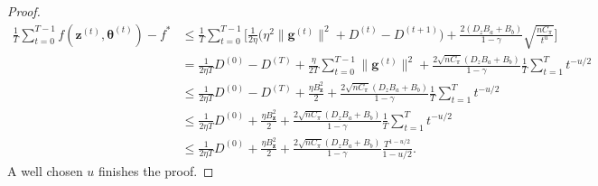 \begin{proof}
\begin{align*}
    \frac{1}{T} \sum_{t=0}^{T-1} f(\bm{z}^{(t)},\bm{\theta}^{(t)}) - f^* 
    &\leq  \frac{1}{T} \sum_{t=0}^{T-1} \Bigg[ 
    \frac{1}{2\eta} \Big( 
         \eta^2\|\bm{g}^{(t)}\|^2
         + D^{(t)} - D^{(t+1)}
     \Big) 
     + \frac{2(D_z B_a+B_b)}{1 - \gamma} \sqrt{\frac{n C_\pi}{t^u}}
    \Bigg] \\
    &=   \frac{1}{2\eta T} D^{(0)} - D^{(T)}   
    +\frac{\eta}{2T} \sum_{t=0}^{T-1} 
         \|\bm{g}^{(t)}\|^2 
        + \frac{2 \sqrt{n C_\pi}  (D_z B_a+B_b)}{1 - \gamma}
        \frac{1}{T}\sum_{t=1}^{T} t^{-u/2}
        \\
    &\leq   \frac{1}{2\eta T} D^{(0)} - D^{(T)}   
    +\frac{\eta B_{\bm{z}}^2}{2} 
        + \frac{2 \sqrt{n C_\pi}  (D_z B_a+B_b)}{1 - \gamma}
        \frac{1}{T}\sum_{t=1}^{T} t^{-u/2} \\
    &\leq   \frac{1}{2\eta T} D^{(0)} 
    +\frac{\eta B_{\bm{z}}^2}{2} 
        + \frac{2 \sqrt{n C_\pi}  (D_z B_a+B_b)}{1 - \gamma}
        \frac{1}{T}\sum_{t=1}^{T} t^{-u/2}
        \\
        &\leq   \frac{1}{2\eta T} D^{(0)} 
        +\frac{\eta B_{\bm{z}}^2}{2} 
            + \frac{2 \sqrt{n C_\pi}  (D_z B_a+B_b)}{1 - \gamma}
            \frac{T^{1-u/2}}{1-u/2}.
\end{align*}
A well chosen $u$ finishes the proof.
\end{proof}